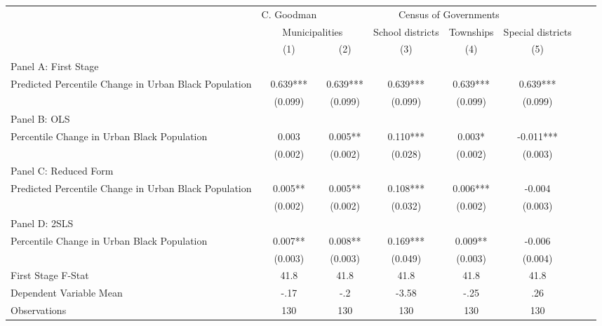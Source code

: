    \begin{tabular}{l*{7}{c}} \toprule
&\multicolumn{1}{c}{C. Goodman}&\multicolumn{4}{c}{Census of Governments}\\\cmidrule(lr){2-2}\cmidrule(lr){3-6}
&\multicolumn{2}{c}{Municipalities}&\multicolumn{1}{c}{School districts}&\multicolumn{1}{c}{Townships}&\multicolumn{1}{c}{Special districts}\\\cmidrule(lr){2-3}\cmidrule(lr){4-6}
&\multicolumn{1}{c}{(1)}&\multicolumn{1}{c}{(2)}&\multicolumn{1}{c}{(3)}&\multicolumn{1}{c}{(4)}&\multicolumn{1}{c}{(5)}\\
\cmidrule(lr){1-6}
\multicolumn{5}{l}{Panel A: First Stage}\\
\cmidrule(lr){1-6}
Predicted Percentile Change in Urban Black Population&    0.639***&    0.639***&    0.639***&    0.639***&    0.639***\\
                &  (0.099)   &  (0.099)   &  (0.099)   &  (0.099)   &  (0.099)   \\
\cmidrule(lr){1-6}
\multicolumn{5}{l}{Panel B: OLS}\\
\cmidrule(lr){1-6}
Percentile Change in Urban Black Population&    0.003   &    0.005** &    0.110***&    0.003*  &   -0.011***\\
                &  (0.002)   &  (0.002)   &  (0.028)   &  (0.002)   &  (0.003)   \\
\cmidrule(lr){1-6}
\multicolumn{5}{l}{Panel C: Reduced Form}\\
\cmidrule(lr){1-6}
Predicted Percentile Change in Urban Black Population&    0.005** &    0.005** &    0.108***&    0.006***&   -0.004   \\
                &  (0.002)   &  (0.002)   &  (0.032)   &  (0.002)   &  (0.003)   \\
\cmidrule(lr){1-6}
\multicolumn{5}{l}{Panel D: 2SLS}\\
\cmidrule(lr){1-6}
Percentile Change in Urban Black Population&    0.007** &    0.008** &    0.169***&    0.009** &   -0.006   \\
                &  (0.003)   &  (0.003)   &  (0.049)   &  (0.003)   &  (0.004)   \\
\midrule
First Stage F-Stat&     41.8   &     41.8   &     41.8   &     41.8   &     41.8   \\
Dependent Variable Mean&     -.17   &      -.2   &    -3.58   &     -.25   &      .26   \\
Observations    &      130   &      130   &      130   &      130   &      130   \\
       \bottomrule \end{tabular}
